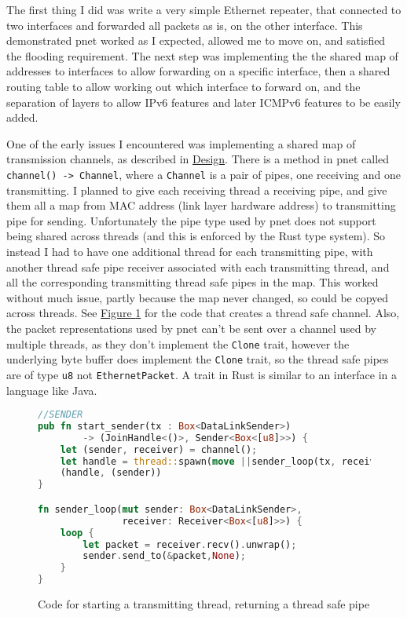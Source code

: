 \documentclass[12pt,a4paper,twoside,openright]{report}
\begin{document}
\bigskip

The first thing I did was write a very simple Ethernet repeater, that connected to two interfaces and forwarded all packets as is, on the other interface.  This demonstrated pnet\cite{pnet_rust} worked as I expected, allowed me to move on, and satisfied the flooding requirement.  The next step was implementing the the shared map of addresses to interfaces to allow forwarding on a specific interface, then a shared routing table to allow working out which interface to forward on, and the separation of layers to allow IPv6 features and later ICMPv6 features to be easily added.

\bigskip

One of the early issues I encountered was implementing a shared map of transmission channels, as described in \hyperref[sec::design]{Design}. There is a method in pnet\cite{pnet_rust} called \verb!channel() -> Channel!, where a \verb!Channel! is a pair of pipes, one receiving and one transmitting.  I planned to give each receiving thread a receiving pipe, and give them all a map from MAC address  (link layer hardware address) to transmitting pipe for sending.  Unfortunately the pipe type used by pnet does not support being shared across threads (and this is enforced by the Rust type system). So instead I had to have one additional thread for each transmitting pipe, with another thread safe pipe receiver associated with each transmitting thread, and all the corresponding transmitting thread safe pipes in the map.  This worked without much issue, partly because the map never changed, so could be copyed across threads.  See \hyperref[fig::sending]{Figure }\ref{fig::sending} for the code that creates a thread safe channel. Also, the packet representations used by pnet can't be sent over a channel used by multiple threads, as they don't implement the \verb!Clone! trait, however the underlying byte buffer does implement the \verb!Clone! trait, so the thread safe pipes are of type \verb!u8! not \verb!EthernetPacket!. A trait in Rust is similar to an interface in a language like Java.

\begin{figure}
\centering
\begin{varwidth}{\linewidth}
\begin{lstlisting}[language=Rust]
//SENDER
pub fn start_sender(tx : Box<DataLinkSender>) 
 		-> (JoinHandle<()>, Sender<Box<[u8]>>) {
    let (sender, receiver) = channel();
    let handle = thread::spawn(move ||sender_loop(tx, receiver));
    (handle, (sender))
}

fn sender_loop(mut sender: Box<DataLinkSender>, 
			   receiver: Receiver<Box<[u8]>>) {
    loop {
        let packet = receiver.recv().unwrap();
        sender.send_to(&packet,None);
    }
}
\end{lstlisting}
\end{varwidth}
\caption{Code for starting a transmitting thread, returning a thread safe pipe}
\label{fig::sending}
\end{figure}
\end{document}

